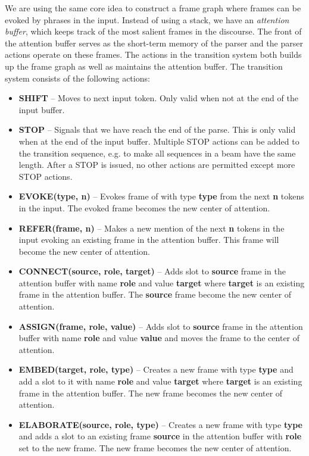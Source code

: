 \documentclass[11pt,a4paper]{article}
\begin{document}
We are using the same core idea to construct a frame graph where frames can be
evoked by phrases in the input. Instead of using a stack, we have an
\emph{attention buffer}, which keeps track of the most salient frames in the
discourse. The front of the attention buffer serves as the short-term memory of
the parser and the parser actions operate on these frames. The actions in the
transition system both builds up the frame graph as well as maintains the
attention buffer. The transition system consists of the following actions:

\begin{itemize}
  \item {\bf SHIFT} -- Moves to next input token. Only valid when not at the
        end of the input buffer.
  \item {\bf STOP} -- Signals that we have reach the end of the parse. This is
        only valid when at the end of the input buffer. Multiple STOP actions
        can be added to the transition sequence, e.g. to make all sequences in a
        beam have the same length. After a STOP is issued, no other actions are
        permitted except more STOP actions.
  \item {\bf EVOKE(type, n)} -- Evokes frame of with type {\bf type} from
        the next {\bf n} tokens in the input. The evoked frame becomes the new
        center of attention.
  \item {\bf REFER(frame, n)} -- Makes a new mention of the next {\bf n} tokens
        in the input evoking an existing frame in the attention buffer. This
        frame will become the new center of attention.
  \item {\bf CONNECT(source, role, target)} -- Adds slot to {\bf source} frame
        in the attention buffer with name {\bf role} and value {\bf target}
        where {\bf target} is an existing frame in the attention buffer. The
        {\bf source} frame become the new center of attention.
  \item {\bf ASSIGN(frame, role, value)} -- Adds slot to {\bf source} frame in
        the attention buffer  with name {\bf role} and value {\bf value} and
        moves the frame to the center of attention.
  \item {\bf EMBED(target, role, type)} -- Creates a new frame with
        type {\bf type} and add a slot to it with name {\bf role} and value
        {\bf target} where {\bf target} is an existing frame in the attention
        buffer. The new frame becomes the new center of attention.
  \item {\bf ELABORATE(source, role, type)} -- Creates a new frame with type
        {\bf type} and adds a slot to an existing frame {\bf source} in the
        attention buffer with {\bf role} set to the new frame. The new frame
        becomes the new center of attention.
\end{itemize}
\end{document}
